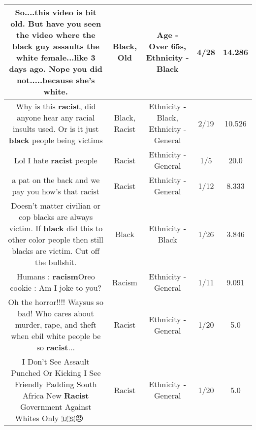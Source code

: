 \documentclass[11pt]{article}
\newlength\mylength
\begin{document}
\begin{center}
\begin{longtable}{|C{.65\mylength}|C{.30\mylength}|C{.12\mylength}|C{.12\mylength}|C{.12\mylength}|}
  \small So....this video is bit \textbf{old}. But have you seen the video where the \textbf{black} guy assaults the white female...like 3 days ago. Nope you did not.....because she's white.\normalsize   & Black, Old & Age - Over 65s, Ethnicity - Black & 4/28 & 14.286 \\  \hline
  \small Why is this \textbf{racist}, did anyone hear any racial insults used. Or is it just \textbf{black} people being victims\normalsize   & Black, Racist & Ethnicity - Black, Ethnicity - General & 2/19 & 10.526 \\  \hline
  \small Lol I hate \textbf{racist} people\normalsize   & Racist & Ethnicity - General & 1/5 & 20.0 \\  \hline
  \small a pat on the back and we pay you how's that racist\normalsize   & Racist & Ethnicity - General & 1/12 & 8.333 \\  \hline
  \small Doesn't matter civilian or cop blacks are always victim. If \textbf{black} did this to other color people then still blacks are victim. Cut off the bullshit.\normalsize   & Black & Ethnicity - Black & 1/26 & 3.846 \\  \hline
  \small Humans : \textbf{racism}Oreo cookie : Am I joke to you?\normalsize   & Racism & Ethnicity - General & 1/11 & 9.091 \\  \hline
  \small Oh the horror!!!! Waysus so bad! Who cares about murder, rape, and theft when ebil white people be so \textbf{racist}...\normalsize   & Racist & Ethnicity - General & 1/20 & 5.0 \\  \hline
  \small I Don't See Assault Punched Or Kicking I See Friendly Padding South Africa New \textbf{Racist} Government Against Whites Only 🇺🇸😠👻👮🏻‍♂️🖕🏻\normalsize   & Racist & Ethnicity - General & 1/20 & 5.0 \\  \hline

\end{longtable}
\end{center}
\end{document}
